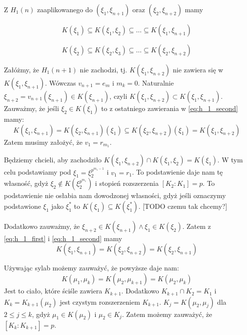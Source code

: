 Z $H_1(n)$ zaaplikowanego do $\left(\xi_1, \xi_{n+1}\right)$ oraz $\left(\xi_2,
\xi_{n+2}\right)$ mamy

\begin{equation}
  K\left(\xi_1\right) \subseteq
  K\left(\xi_1, \xi_2\right) \subseteq
  \ldots \subseteq
  K\left(\xi_1, \xi_{n+1}\right)
  \label{eq:h_1_first}
\end{equation}

\begin{equation}
  K\left(\xi_2\right) \subseteq
  K\left(\xi_2, \xi_3\right) \subseteq
  \ldots \subseteq
  K\left(\xi_2, \xi_{n+2}\right)
  \label{eq:h_1_second}
\end{equation}

Załóżmy, że $H_1(n+1)$ nie zachodzi, tj. $K\left(\xi_1, \xi_{n+2}\right)$ nie
zawiera się w $K\left(\xi_1, \xi_{n+1}\right)$. Wówczas $v_{n+1} = e_m$ i $m_k =
0$. 
Naturalnie $\xi_{n+2} = v_{n+1}\left(\xi_{n+1}\right) \in
K\left(\xi_{n+1}\right)$, czyli $K\left(\xi_1, \xi_{n+2}\right) \subset
K\left(\xi_1, \xi_{n+1}\right)$.
Zauważmy, że jeśli $\xi_2 \in K\left(\xi_1\right)$ to z ostatniego zawierania w
\ref{eq:h_1_second} mamy:
\[ 
  K\left(\xi_1, \xi_{n+1}\right) =
  K\left(\xi_2, \xi_{n+1}\right)\left(\xi_1\right) \subseteq
  K\left(\xi_2, \xi_{n+2}\right)\left(\xi_1\right) =
K\left(\xi_1, \xi_{n+2}\right)\]
Zatem musimy założyć, że $v_1 = r_{m_1}$.

Będziemy chcieli, aby zachodziło $K\left(\xi_1, \xi_{n+2}\right) \cap
K\left(\xi_1, \xi_2\right) = K\left(\xi_1\right)$. W tym celu podstawiamy pod
$\xi_1 = \xi_2^{p^{m_1-1}}$ i $v_1 = r_1$. To podstawienie daje nam tę własność,
gdyż $\xi_2 \not \in K\left(\xi_2^{p^{m_1}}\right)$ i stopień rozszerzenia
$\left[K_2 : K_1\right] = p$. To podstawienie nie osłabia nam dowodzonej
własności, gdyż jeśli oznaczymy podstawione $\xi_1$ jako $\xi_1^*$ to
$K\left(\xi_1\right) \subseteq K\left(\xi_1^*\right)$.
[TODO czemu tak chcemy?]

Dodatkowo zauważmy, że 
$\xi_{n+2} \in K\left(\xi_{n+1}\right) \land \xi_{1} \in K\left(\xi_{2}\right)$.
Zatem z \ref{eq:h_1_first} i \ref{eq:h_1_second} mamy
\[
  K\left(\xi_1, \xi_{n+1}\right) =
  K\left(\xi_2, \xi_{n+2}\right) =
  K\left(\xi_2, \xi_{n+1}\right)
\]

Używając sylab możemy zauważyć, że powyższe daje nam:
\[
  K\left(\mu_1, \mu_{k}\right) =
  K\left(\mu_2, \mu_{k+1}\right) =
  K\left(\mu_2, \mu_{k}\right)
\]
Jest to ciało, które ściśle zawiera $K_{k+1}$. Dodatkowo $K_{k+1} \cap K_2 =
K_1$ i $K_k = K_{k+1}\left(\mu_2\right)$ jest czystym rozszerzeniem $K_{k+1}$.
$K_j = K\left(\mu_2, \mu_j\right)$ dla $2 \leq j \leq k$, gdyż $\mu_1 \in
K\left(\mu_2\right)$ i $\mu_2 \in K_j$. Zatem możemy zauważyć, że $\left[K_k :
K_{k+1}\right] = p$.

